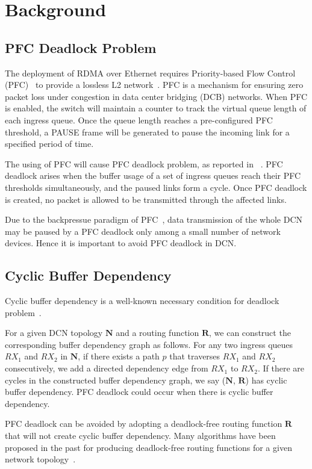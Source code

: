 \section{Background}\label{sec:background}

\subsection{PFC Deadlock Problem}\label{subsec:pfcdeadlock}

The deployment of RDMA over Ethernet requires Priority-based Flow Control (PFC)~\cite{pfc}  to provide a lossless L2 network~\cite{dcqcn, rdmaatscale}. 
PFC is a mechanism for ensuring zero packet loss under congestion in data center bridging (DCB) networks. When PFC is enabled, the switch will maintain a counter to track the virtual queue length of each ingress queue. Once the queue length reaches a pre-configured PFC threshold, a PAUSE frame will be generated to pause the incoming link for a specified period of time.

The using of PFC will cause PFC deadlock problem, as reported in ~\cite{rdmaatscale}. PFC deadlock arises when the buffer usage of a set of ingress queues reach their PFC thresholds simultaneously, and the paused links form a cycle. Once PFC deadlock is created, no packet is allowed to be transmitted through the affected links. 

Due to the backpressue paradigm of PFC~\cite{tcpbolt,dcqcn}, data transmission of the whole DCN may be paused by a PFC deadlock only among a small number of network devices. Hence it is important to avoid PFC deadlock in DCN.



\subsection{Cyclic Buffer Dependency}\label{subsec:cyclicbd}

Cyclic buffer dependency is a well-known necessary condition for deadlock problem~\cite{gerla1980flow}.

For a given DCN topology $\textbf{N}$ and a routing function $\textbf{R}$, we can construct the corresponding buffer dependency graph as follows. For any two ingress queues $RX_1$ and $RX_2$ in $\textbf{N}$, if there exists a path $p$ that traverses $RX_1$ and  $RX_2$ consecutively, we add a directed dependency edge from $RX_1$ to $RX_2$.  If there are cycles in the constructed buffer dependency graph, we say ($\textbf{N}$, $\textbf{R}$) has cyclic buffer dependency. PFC deadlock could occur when there is cyclic buffer dependency.

PFC deadlock can be avoided by adopting a deadlock-free routing function $\textbf{R}$ that will not create cyclic buffer dependency. Many algorithms have been proposed in the past for producing deadlock-free routing functions for a given network topology~\cite{dally,flich2012survey,tcpbolt}.

%
